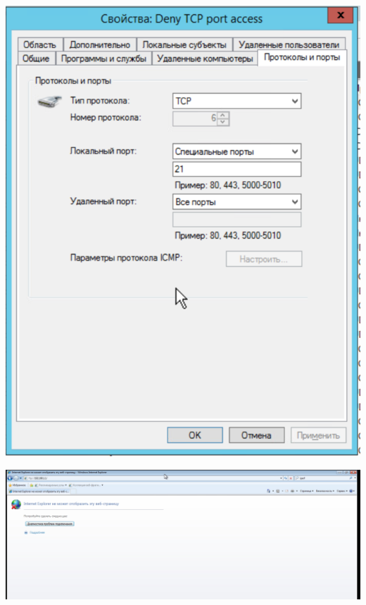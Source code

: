 \documentclass[a4paper,14pt]{extarticle}
\begin{document}
    \begin{center}
        \includegraphics[scale=0.7]{8.2.2.png}
    \end{center}

    \begin{center}
        \includegraphics[scale=0.38]{8.2.3.png}
    \end{center}
\end{document}
